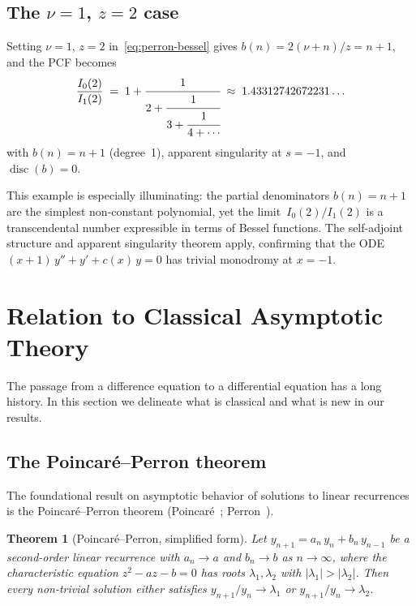 \documentclass[11pt,a4paper]{amsart}
\theoremstyle{plain}
\newtheorem{theorem}{Theorem}[section]
\theoremstyle{definition}
\theoremstyle{remark}
\newcommand{\disc}{\operatorname{disc}}
\begin{document}
\subsection{The \texorpdfstring{$\nu=1$, $z=2$}{v=1, z=2} case}
\label{sec:bessel-z2}

Setting $\nu=1$, $z=2$ in~\eqref{eq:perron-bessel} gives
$b(n) = 2(\nu+n)/z = n+1$, and the PCF becomes
\begin{equation}\label{eq:I0I1-z2}
  \frac{I_0(2)}{I_1(2)}
  \;=\; 1 + \cfrac{1}{2 + \cfrac{1}{3 + \cfrac{1}{4 + \cdots}}}
  \;\approx\; 1.43312742672231\ldots
\end{equation}
with $b(n) = n+1$ (degree~1), apparent singularity at $s = -1$,
and $\disc(b) = 0$.

This example is especially illuminating: the partial denominators
$b(n) = n+1$ are the simplest non-constant polynomial, yet the
limit~$I_0(2)/I_1(2)$ is a transcendental number expressible in
terms of Bessel functions.  The self-adjoint structure and apparent
singularity theorem apply, confirming that the ODE
$(x+1)\,y'' + y' + c(x)\,y = 0$ has trivial monodromy at $x = -1$.

\section{Relation to Classical Asymptotic Theory}
\label{sec:literature}

The passage from a difference equation to a differential equation
has a long history.  In this section we delineate what is classical
and what is new in our results.

\subsection{The Poincar\'e--Perron theorem}

The foundational result on asymptotic behavior of solutions to
linear recurrences is the Poincar\'e--Perron theorem
(Poincar\'e~\cite{Poincare85}; Perron~\cite{Perron21}).

\begin{theorem}[Poincar\'e--Perron, simplified form]
\label{thm:poincare-perron}
Let $y_{n+1} = a_n\,y_n + b_n\,y_{n-1}$ be a second-order linear
recurrence with $a_n \to a$ and $b_n \to b$ as $n\to\infty$, where
the characteristic equation $z^2 - az - b = 0$ has roots
$\lambda_1,\lambda_2$ with $|\lambda_1| > |\lambda_2|$.  Then
every non-trivial solution either satisfies
$y_{n+1}/y_n \to \lambda_1$ or $y_{n+1}/y_n \to \lambda_2$.
\end{theorem}
\end{document}
